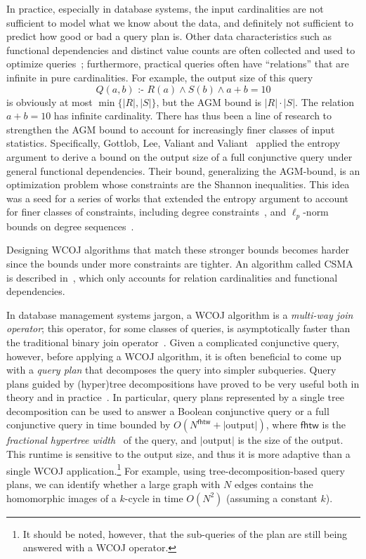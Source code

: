 \documentclass{theoretics}
\newcommand{\cd}{\text{ :- }}
\newcommand{\agm}{\textsf{AGM}\xspace}
\newcommand{\csma}{\textsf{CSMA}\xspace}
\newcommand{\fhtw}{\textsf{fhtw}}
\begin{document}
In practice, especially in database systems, the input cardinalities are not sufficient to
model what we know about the data, and definitely not sufficient to predict how good or bad
a query plan is. Other data characteristics such as functional dependencies and distinct
value counts are often collected and used to optimize queries~\cite{DBLP:conf/icdt/000122,DBLP:journals/pvldb/LeisGMBK015};
furthermore, practical queries often have ``relations'' that are infinite in pure
cardinalities. For example, the output size of this query
\[ Q(a,b) \cd R(a) \wedge S(b) \wedge a+b=10 \] is obviously at most $\min\{|R|,|S|\}$, but
the \agm bound is $|R|\cdot |S|$. The relation $a+b=10$ has infinite cardinality. There
has thus been a line of research to strengthen the \agm bound to account for increasingly
finer classes of input statistics.
Specifically, Gottlob, Lee, Valiant and Valiant~\cite{DBLP:journals/jacm/GottlobLVV12,DBLP:conf/pods/GottlobLV09}
applied the entropy argument to derive a bound on the output size of a full conjunctive query
under general functional dependencies. Their bound, generalizing the \agm-bound, is an optimization
problem whose constraints are the Shannon inequalities.
This idea was a seed for a series of works that extended the entropy argument to account for
finer classes of constraints, including degree constraints~\cite{DBLP:conf/pods/KhamisNS16,
DBLP:conf/pods/Khamis0S17,10.1145/3651597}, and
$\ell_p$-norm bounds on degree sequences~\cite{10.1145/3651597}.

Designing WCOJ algorithms that match these stronger
bounds becomes harder since the bounds under more constraints are tighter. An algorithm
called  \csma is described in~\cite{DBLP:conf/pods/KhamisNS16}, which only accounts for
relation cardinalities and functional dependencies.

In database management systems jargon, a WCOJ algorithm is a {\em multi-way join operator};
this operator, for some classes of queries, is asymptotically faster than the traditional
binary join operator~\cite{DBLP:journals/jacm/NgoPRR18}. Given a complicated conjunctive query,
however, before applying a WCOJ algorithm, it is often beneficial to come up with a {\em
query plan} that decomposes the query into simpler subqueries. Query plans guided by
(hyper)tree decompositions have proved to be very useful both in theory and in
practice~\cite{DBLP:conf/pods/GottlobGLS16}. In particular, query plans represented by a
single tree decomposition can be used to answer a Boolean conjunctive query or a full
conjunctive query in time bounded by $O(N^{\fhtw}+|\text{output}|)$, where $\fhtw$ is
the {\em fractional hypertree width}~\cite{DBLP:journals/talg/GroheM14} of the query, and
$|\text{output}|$ is the size of the output. This runtime is sensitive to the output size,
and thus it is more adaptive than a single WCOJ application.\footnote{It should be noted,
however, that the sub-queries of the plan are still being answered with a WCOJ operator.}
For example, using tree-decomposition-based query plans, we can identify whether a large
graph with $N$ edges contains the homomorphic images of a $k$-cycle in time $O(N^2)$
(assuming a constant $k$).
\end{document}
